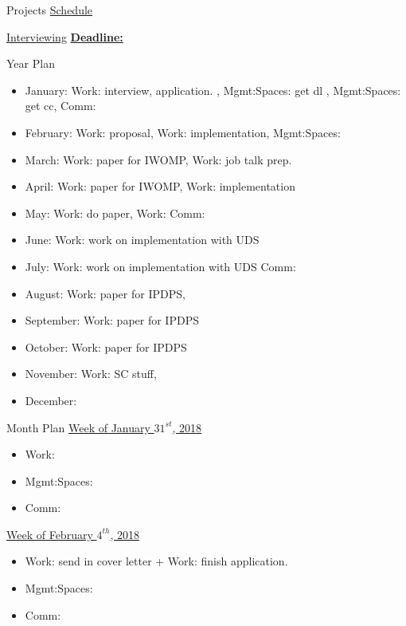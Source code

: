 \begin{columns}
\begin{column}{0.10\linewidth}
\begin{block}{Projects}
\underline{Schedule} \\ 
\begin{enumerate}
\pitem 
\end{enumerate} 
\end{block} 

\underline{Interviewing} 
\underline{\textbf{Deadline:}} 
\begin{enumerate}
\pitem 
\pitem 
\end{enumerate} 



\begin{block}{Year Plan}
\begin{itemize}
\tiny \item \tiny January: Work: interview, application. , Mgmt:Spaces: get dl , Mgmt:Spaces: get cc, Comm: 
\item \tiny February: Work: proposal, Work: implementation, Mgmt:Spaces: 
\item \tiny March: Work: paper for IWOMP, Work: job talk prep.
\item \tiny April: Work: paper for IWOMP, Work: implementation  
\item \tiny May: Work: do paper, Work: Comm: 
\item \tiny June: Work: work on implementation with UDS 
\item \tiny July: Work: work on implementation with UDS Comm:  
\item \tiny August: Work: paper for IPDPS, 
\item \tiny September: Work: paper for IPDPS 
\item \tiny October: Work: paper for IPDPS  
\item \tiny November: Work: SC stuff, 
\item \tiny December: 
\end{itemize} 
\end{block}

\begin{block}{Month Plan}
\underline{Week of January $31^{st}$, 2018}
\begin{itemize}
\tiny \item \tiny Work: 
\item \tiny Mgmt:Spaces: 
\item \tiny Comm: 
\end{itemize}

\underline{Week of February $4^{th}$, 2018}
\begin{itemize}
\tiny \item \tiny Work: send in cover letter + Work: finish application.  
\item \tiny Mgmt:Spaces: 
\item \tiny Comm: 
\end{itemize}


\end{block}
\end{column}
\end{columns}
